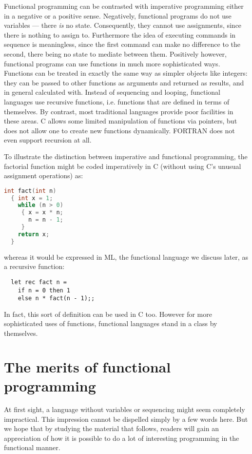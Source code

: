 Functional programming can be contrasted with imperative programming either
in a negative or a positive sense. Negatively, functional programs do not use
variables --- there {\em is} no state. Consequently, they cannot use
assignments, since there is nothing to assign to. Furthermore the idea of
executing commands in sequence is meaningless, since the first command can make
no difference to the second, there being no state to mediate between them.
Positively however, functional programs can use functions in much more
sophisticated ways. Functions can be treated in exactly the same way as simpler
objects like integers: they can be passed to other functions as arguments and
returned as results, and in general calculated with. Instead of sequencing and
looping, functional languages use recursive functions, i.e. functions that are
defined in terms of themselves. By contrast, most traditional languages provide
poor facilities in these areas. C allows some limited manipulation of functions
via pointers, but does not allow one to create new functions dynamically.
FORTRAN does not even support recursion at all.

To illustrate the distinction between imperative and functional programming,
the factorial function might be coded imperatively in C (without using C's
unusual assignment operations) as:

\begin{lstlisting}[language=C]
  int fact(int n)
  { int x = 1;
    while (n > 0)
     { x = x * n;
       n = n - 1;
     }
    return x;
  }
\end{lstlisting}

\noindent whereas it would be expressed in ML, the functional language we
discuss later, as a recursive function:

\begin{lstlisting}
  let rec fact n =
    if n = 0 then 1
    else n * fact(n - 1);;
\end{lstlisting}

In fact, this sort of definition can be used in C too. However for more
sophisticated uses of functions, functional languages stand in a class by
themselves.

\section{The merits of functional programming}

At first sight, a language without variables or sequencing might seem
completely impractical. This impression cannot be dispelled simply by a few
words here. But we hope that by studying the material that follows, readers
will gain an appreciation of how it is possible to do a lot of interesting
programming in the functional manner.

